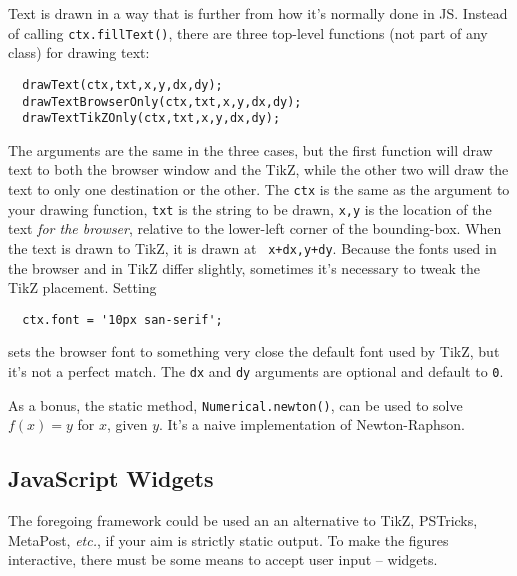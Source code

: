 \documentclass[10pt]{article}
\begin{document}
Text is drawn in a way that is further from how it's normally done in
JS. Instead of calling {\tt ctx.fillText()}, there are three top-level
functions (not part of any class) for drawing text:
\begin{verbatim}
  drawText(ctx,txt,x,y,dx,dy);
  drawTextBrowserOnly(ctx,txt,x,y,dx,dy);
  drawTextTikZOnly(ctx,txt,x,y,dx,dy);
\end{verbatim}
The arguments are the same in the three cases, but the first function will draw
text to both the browser window and the TikZ, while the other two will
draw the text to only one destination or the other. The {\tt ctx} is
the same as the argument to your drawing function, {\tt txt} is the
string to be drawn, {\tt x,y} is the location of the text \emph{for
the browser}, relative to the lower-left corner of the
bounding-box. When the text is drawn to TikZ, it is drawn at {\tt
  x+dx,y+dy}. Because the fonts used in the browser and in TikZ differ
slightly, sometimes it's necessary to tweak the TikZ placement. Setting
\begin{verbatim}
  ctx.font = '10px san-serif';
\end{verbatim}
sets the browser font to something very close the default font used
by TikZ, but it's not a perfect match.  The {\tt dx} and {\tt dy}
arguments are optional and default to {\tt 0}.

As a bonus, the static method, {\tt Numerical.newton()}, can be used to
solve $f(x) = y$ for $x$, given $y$. It's a naive implementation of Newton-Raphson.

\subsection{JavaScript Widgets}

The foregoing framework could be used an an alternative to TikZ,
PSTricks, MetaPost, \emph{etc.}, if your aim is strictly static
output. To make the figures interactive, there must be some means to
accept user input -- widgets.
\end{document}
